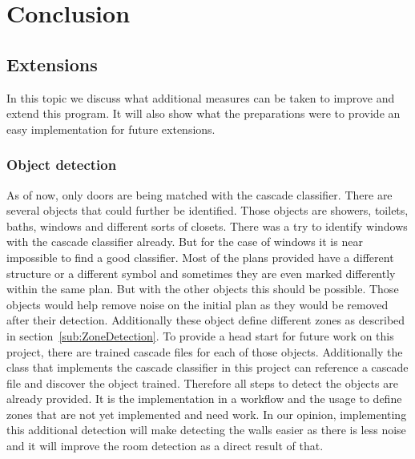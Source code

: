 \section{Conclusion}
\subsection{Extensions}
In this topic we discuss what additional measures can be taken to improve and extend this program. It will also show what the preparations were to provide an easy implementation for future extensions.

\subsubsection{Object detection}
\label{sub:FutureObjectDetection}
As of now, only doors are being matched with the cascade classifier. There are several objects that could further be identified. Those objects are showers, toilets, baths, windows and different sorts of closets.
There was a try to identify windows with the cascade classifier already. But for the case of windows it is near impossible to find a good classifier. Most of the plans provided have a different structure or a different symbol and sometimes they are even marked differently within the same plan. But with the other objects this should be possible. Those objects would help remove noise on the initial plan as they would be removed after their detection. Additionally these object define different zones as described in section~\ref{sub:ZoneDetection}. To provide a head start for future work on this project, there are trained cascade files for each of those objects. Additionally the class that implements the cascade classifier in this project can reference a cascade file and discover the object trained. Therefore all steps to detect the objects are already provided. It is the implementation in a workflow and the usage to define zones that are not yet implemented and need work. In our opinion, implementing this additional detection will make detecting the walls easier as there is less noise and it will improve the room detection as a direct result of that.


